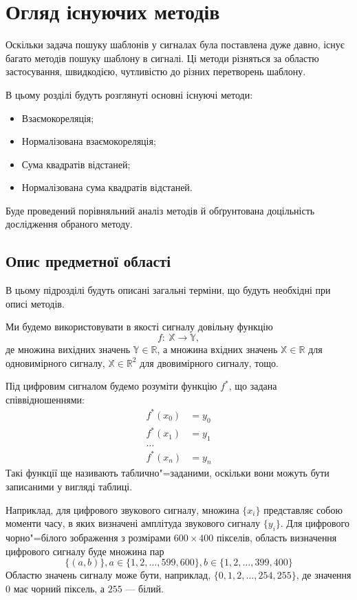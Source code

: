 \chapter{Огляд існуючих методів}

Оскільки задача пошуку шаблонів у сигналах була поставлена дуже давно, існує багато методів пошуку шаблону в сигналі.
Ці методи різняться за областю застосування, швидкодією, чутливістю до різних перетворень шаблону.

В цьому розділі будуть розглянуті основні існуючі методи:
\begin{itemize}
    \item Взаємокореляція;
    \item Нормалізована взаємокореляція;
    \item Сума квадратів відстаней;
    \item Нормалізована сума квадратів відстаней.
\end{itemize}

Буде проведений порівняльний аналіз методів й обґрунтована доцільність дослідження обраного методу.

\section{Опис предметної області}
    В цьому підрозділі будуть описані загальні терміни, що будуть необхідні при описі методів.

    Ми будемо використовувати в якості сигналу довільну функцію
    \begin{equation*}
        f:\:\mathbb{X} \rightarrow \mathbb{Y},
    \end{equation*}
    де множина вихідних значень $\mathbb{Y} \in \mathbb{R}$, а множина
    вхідних значень $\mathbb{X} \in \mathbb{R}$ для одновимірного сигналу, $\mathbb{X} \in \mathbb{R}^2$ для
    двовимірного сигналу, тощо.

    Під цифровим сигналом будемо розуміти функцію $f^*$, що задана співвідношеннями:
    \begin{align*}
        f^*(x_0) &= y_0\\
        f^*(x_1) &= y_1\\
        \dots\\
        f^*(x_n) &= y_n
    \end{align*}
    Такі функції ще називають таблично"=заданими, оскільки вони можуть бути записаними у вигляді таблиці.

    Наприклад, для цифрового звукового сигналу, множина $\{x_i\}$ представляє собою моменти часу, в яких визначені
    амплітуда звукового сигналу $\{y_i\}$.
    Для цифрового чорно"=білого зображення з розмірами $600 \times 400$ пікселів, область визначення цифрового сигналу
    буде множина пар
    \[\{ (a, b) \}, a \in \{1,2,\dots,599,600\}, b \in \{1,2,\dots,399,400\}\]
    Областю значень сигналу може бути, наприклад, $\{0,1,2,\dots,254,255\}$, де значення $0$ має чорний піксель, а
    $255$ --- білий.

